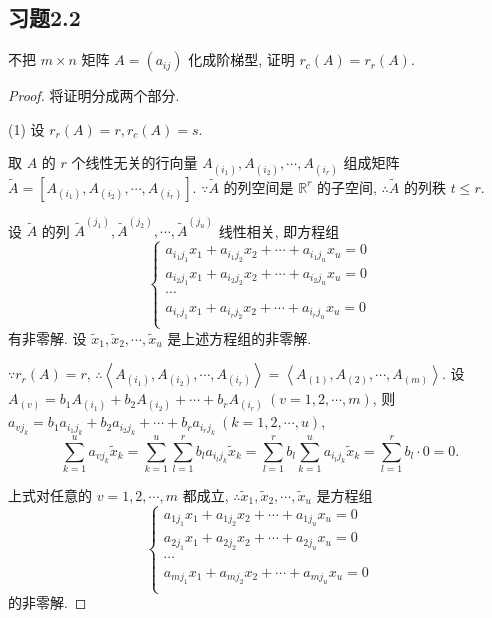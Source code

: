 \documentclass{ctexart}
\begin{document}
\subsection{习题2.2}
\begin{exercise}%
    不把 $m\times n$ 矩阵 $A=(a_{ij})$ 化成阶梯型, 证明 $r_c(A)=r_r(A)$.
\end{exercise}
\begin{proof}
    将证明分成两个部分.

    (1) 设 $r_r(A)=r,r_c(A)=s$.
    
    取 $A$ 的 $r$ 个线性无关的行向量 $A_{(i_1)},A_{(i_2)},\cdots,A_{(i_r)}$ 组成矩阵 $\widetilde{A}=[A_{(i_1)},A_{(i_2)},\cdots,A_{(i_r)}]$. $\because\widetilde{A}$ 的列空间是 $\mathbb{R}^r$ 的子空间, $\therefore\widetilde{A}$ 的列秩 $t\leq r$.

    设 $\widetilde{A}$ 的列 $\widetilde{A}^{(j_1)},\widetilde{A}^{(j_2)},\cdots,\widetilde{A}^{(j_u)}$ 线性相关, 即方程组
    \[\begin{cases}
        a_{i_1j_1}x_1+a_{i_1j_2}x_2+\cdots+a_{i_1j_u}x_u=0 \\
        a_{i_2j_1}x_1+a_{i_2j_2}x_2+\cdots+a_{i_2j_u}x_u=0 \\
        \cdots \\
        a_{i_rj_1}x_1+a_{i_rj_2}x_2+\cdots+a_{i_rj_u}x_u=0 \\
    \end{cases}\]
    有非零解. 设 $\tilde{x}_1,\tilde{x}_2,\cdots,\tilde{x}_u$ 是上述方程组的非零解.

    $\because r_r(A)=r$, $\therefore\left<A_{(i_1)},A_{(i_2)},\cdots,A_{(i_r)}\right>=\left<A_{(1)},A_{(2)},\cdots,A_{(m)}\right>$. 设 $A_{(v)}=b_1A_{(i_1)}+b_2A_{(i_2)}+\cdots+b_rA_{(i_r)}\ (v=1,2,\cdots,m)$, 则 $a_{vj_k}=b_1a_{i_1j_k}+b_2a_{i_2j_k}+\cdots+b_ra_{i_rj_k}\ (k=1,2,\cdots,u)$,
    \[\sum\limits_{k=1}^ua_{vj_k}\tilde{x}_k=\sum\limits_{k=1}^u\sum\limits_{l=1}^rb_la_{i_lj_k}\tilde{x}_k=\sum\limits_{l=1}^rb_l\sum\limits_{k=1}^ua_{i_lj_k}\tilde{x}_k=\sum\limits_{l=1}^rb_l\cdot0=0.\]

    上式对任意的 $v=1,2,\cdots,m$ 都成立, $\therefore\tilde{x}_1,\tilde{x}_2,\cdots,\tilde{x}_u$ 是方程组
    \[\begin{cases}
        a_{1j_1}x_1+a_{1j_2}x_2+\cdots+a_{1j_u}x_u=0 \\
        a_{2j_1}x_1+a_{2j_2}x_2+\cdots+a_{2j_u}x_u=0 \\
        \cdots \\
        a_{mj_1}x_1+a_{mj_2}x_2+\cdots+a_{mj_u}x_u=0 \\
    \end{cases}\]
    的非零解.
    

\end{proof}
\end{document}
